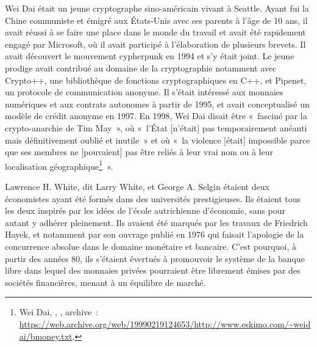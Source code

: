 Wei Dai était un jeune cryptographe sino-américain vivant à Seattle. Ayant fui la Chine communiste et émigré aux États-Unis avec ses parents à l'âge de 10 ans, il avait réussi à se faire une place dans le monde du travail et avait été rapidement engagé par Microsoft, où il avait participé à l'élaboration de plusieurs brevets. Il avait découvert le mouvement cypherpunk en 1994 et s'y était joint. Le jeune prodige avait contribué au domaine de la cryptographie notamment avec Crypto++, une bibliothèque de fonctions cryptographiques en C++, et Pipenet, un protocole de communication anonyme. Il s'était intéressé aux monnaies numériques et aux contrats autonomes à partir de 1995, et avait conceptualisé un modèle de crédit anonyme en 1997. En 1998, Wei Dai disait être «~fasciné par la crypto-anarchie de Tim May~», où «~l'État [n'était] pas temporairement anéanti mais définitivement oublié et inutile~» et où «~la violence [était] impossible parce que ses membres ne [pouvaient] pas être reliés à leur vrai nom ou à leur localisation géographique\footnote{Wei Dai, , , archive~: \url{https://web.archive.org/web/19990219124653/http://www.eskimo.com/~weidai/bmoney.txt}.}~». %

Lawrence H. White, dit Larry White, et George A. Selgin étaient deux économistes ayant été formés dans des universités prestigieuses. Ils étaient tous les deux inspirés par les idées de l'école autrichienne d'économie, sans pour autant y adhérer pleinement. Ils avaient été marqués par les travaux de Friedrich Hayek, et notamment par son ouvrage  publié en 1976 qui faisait l'apologie de la concurrence absolue dans le domaine monétaire et bancaire. C'est pourquoi, à partir des années 80, ils s'étaient évertués à promouvoir le système de la banque libre dans lequel des monnaies privées pourraient être librement émises par des sociétés financières, menant à un équilibre de marché.

